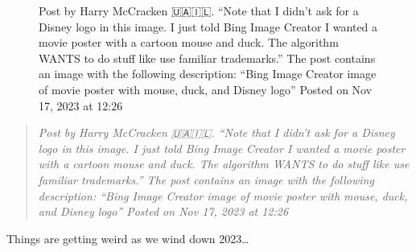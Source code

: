 \begin{figure}
\centering
{}
\caption{Post by Harry McCracken 🇺🇦🇮🇱. ``Note that I didn't ask for a
Disney logo in this image. I just told Bing Image Creator I wanted a
movie poster with a cartoon mouse and duck. The algorithm WANTS to do
stuff like use familiar trademarks.'' The post contains an image with
the following description: ``Bing Image Creator image of movie poster
with mouse, duck, and Disney logo'' Posted on Nov 17, 2023 at 12:26}
\end{figure}

\begin{quote}
\emph{Post by Harry McCracken 🇺🇦🇮🇱. ``Note that I didn't ask for a
Disney logo in this image. I just told Bing Image Creator I wanted a
movie poster with a cartoon mouse and duck. The algorithm WANTS to do
stuff like use familiar trademarks.'' The post contains an image with
the following description: ``Bing Image Creator image of movie poster
with mouse, duck, and Disney logo'' Posted on Nov 17, 2023 at 12:26}
\end{quote}

Things are getting weird as we wind down 2023\ldots{}
